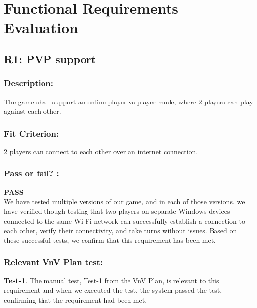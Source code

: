 \documentclass[12pt, titlepage]{article}
\begin{document}
\newpage

\tableofcontents

\listoftables %

\listoffigures %

\newpage



\section{Functional Requirements Evaluation}


\subsection{R1: PVP support}
\label{R1}

 \subsubsection*{Description:}  The game shall support an online player vs player mode, where 2 players can play against
each other.

 \subsubsection*{Fit Criterion:}  2 players can connect to each other over an internet connection.
 
 \subsubsection*{Pass or fail? :}
 
 \noindent \textbf{PASS}\\
 
 We have tested multiple versions of our game, and in each of those versions, we have verified though testing that two players on separate Windows devices connected to the same Wi-Fi network can successfully establish a connection to each other, verify their connectivity, and take turns without issues. Based on these successful tests, we confirm that this requirement has been met.
 
 \subsubsection*{Relevant VnV Plan test: }  
 
  \noindent \textbf{ Test-1}. The manual test, Test-1 from the VnV Plan, is relevant to this requirement and when we executed the test, the system passed the test, confirming that the requirement had been met.
\end{document}
